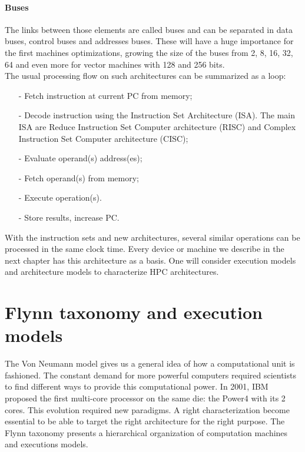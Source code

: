 \paragraph{Buses}
The links between those elements are called buses and can be separated in data buses, control buses and addresses buses.
These will have a huge importance for the first machines optimizations, growing the size of the buses from 2, 8, 16, 32, 64 and even more for vector machines with 128 and 256 bits.\\

The usual processing flow on such architectures can be summarized as a loop: 
\begin{itemize}[noitemsep,nolistsep]
\item[-] Fetch instruction at current PC from memory;
\item[-] Decode instruction using the Instruction Set Architecture (ISA). The main ISA are Reduce Instruction Set Computer architecture (RISC) and Complex Instruction Set Computer architecture (CISC);
\item[-] Evaluate operand(s) address(es);
\item[-] Fetch operand(s) from memory;
\item[-] Execute operation(s).
\item[-] Store results, increase PC.\\
\end{itemize}

With the instruction sets and new architectures, several similar operations can be processed in the same clock time.
Every device or machine we describe in the next chapter has this architecture as a basis. 
One will consider execution models and architecture models to characterize HPC architectures.

\section{Flynn taxonomy and execution models}
The Von Neumann model gives us a general idea of how a computational unit is fashioned. 
The constant demand for more powerful computers required scientists to find different ways to provide this computational power.
In 2001, IBM proposed the first multi-core processor on the same die: the Power4 with its 2 cores.
This evolution required new paradigms.
A right characterization become essential to be able to target the right architecture for the right purpose. 
The Flynn taxonomy presents a hierarchical organization of computation machines and executions models.

